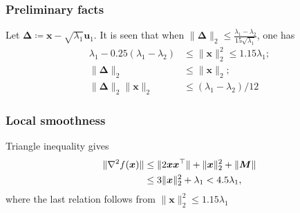 \documentclass[compress,
mathserif,wide,%
]{beamer}
\begin{document}
\begin{frame}
	\frametitle{Preliminary facts}
	Let $\bm{\Delta} \coloneqq \bm{x} - \sqrt{\lambda_1} \bm{u}_{1}$. It is seen that when $\| \bm{\Delta} \|_{2} \leq \frac{\lambda_{1}-\lambda_{2}}{15\sqrt{\lambda_{1}}}$, one has
	\begin{align*}
	\lambda_1 - 0.25 (\lambda_1 - \lambda_2) &\leq \|\bm{x}\|_2^2 \leq 1.15 \lambda_{1}; \\
	\| \bm{\Delta} \|_{2} &\leq \| \bm{x} \|_2; \\
	\| \bm{\Delta} \|_{2} \|\bm{x} \|_2 &\leq (\lambda_{1} - \lambda_{2}) / 12
	\end{align*}
\end{frame}

\begin{frame}
	\frametitle{Local smoothness}
	Triangle inequality gives
	\begin{align*}
		\| \nabla^{2} f (\bm{x}) \| &\leq \| 2{\bm x}{\bm x}^{\top} \| +  \|\bm{x}\|_2^2 + \| \bm{M} \| \\
		& \leq 3 \|\bm{x}\|_2^2 + \lambda_{1} < 4.5 \lambda_{1},
	\end{align*}
	where the last relation follows from $\|\bm{x} \|_2^2 \leq 1.15 \lambda_{1}$
\end{frame}
\end{document}
